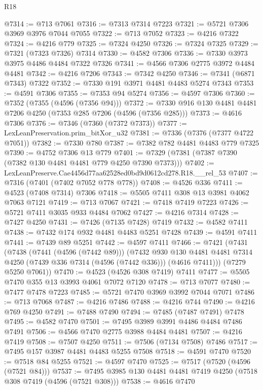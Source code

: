 \begin{lexlean}{R18}
\begin{coremodule}
@7314 := @713 @7061
@7316 := @7313 @7314 @7223
@7321 := @5721 @7306 @3969 @3976 @7044 @7055
@7322 := @713 @7052
@7323 := @4216 @7322
@7324 := @4216 @779
@7325 := @7324 @4250
@7326 := @7324 @7325
@7329 := @7321 (@7323 @7326) @7314
@7330 := @4582 @7306
@7336 := @7330 @3973 @3975 @4486 @4484 @7322 @7326
@7341 := @4566 @7306 @2775 @3972 @4484 @4481
@7342 := @4216 @7206
@7343 := @7342 @4250
@7346 := @7341 (@6871 @7343) @7322
@7352 := @7330 @191 @3971 @4481 @4483 @5274 @7343
@7353 := @4591 @7306
@7355 := @7353 @94 @5274
@7356 := @4597 @7306
@7360 := @7352 (@7355 (@4596 (@7356 @94)))
@7372 := @7330 @916 @130 @4481 @4481 @7206 @4250 (@7353 @285 @7206 (@4596 (@7356 @285)))
@7373 := @4616 @7306
@7376 := @7346 (@7360 (@7372 @7373))
@7377 := LexLeanPreservation.prim_bitXor_u32
@7381 := @7336 (@7376 (@7377 @4722 @7051))
@7382 := @7330 @780
@7387 := @7382 @782 @4481 @4483 @779 @7325
@7390 := @4752 @7306 @13 @779
@7401 := @7329 (@7381 (@7387 @7390 (@7382 @130 @4481 @4481 @779 @4250 @7390 @7373)))
@7402 := LexLeanPreserve.Cae4456d77aa62528ed0bd9d0612cd278.R18.__rel_53
@7407 := @7316 (@7401 (@7402 @7052 @778 @778))
@7408 := @4526 @336
@7411 := @4523 (@7408 @7314) @7306
@7418 := @5505 @7411 @308 @13 @3981 @4062 @7063 @7121
@7419 := @713 @7067
@7421 := @7418 @7419 @7223
@7426 := @5721 @7411 @3035 @933 @4484 @7062
@7427 := @4216 @7314
@7428 := @7427 @4250
@7431 := @7426 (@7135 @7428) @7419
@7432 := @4582 @7411
@7438 := @7432 @174 @932 @4481 @4483 @5251 @7428
@7439 := @4591 @7411
@7441 := @7439 @89 @5251
@7442 := @4597 @7411
@7466 := @7421
    (@7431
      (@7438
        (@7441 (@4596 (@7442 @89)))
        (@7432
          @930
          @130
          @4481
          @4481
          @7314
          @4250
          (@7439 @336 @7314 (@4596 (@7442 @336)))
          (@4616 @7411)))
      (@7279 @5250 @7061))
@7470 := @4523 (@4526 @308 @7419) @7411
@7477 := @5505 @7470 @355 @13 @3993 @4061 @7072 @7120
@7478 := @713 @7077
@7480 := @7477 @7478 @7223
@7485 := @5721 @7470 @3969 @3992 @7044 @7071
@7486 := @713 @7068
@7487 := @4216 @7486
@7488 := @4216 @744
@7490 := @4216 @769 @4250
@7491 := @7488 @7490
@7494 := @7485 (@7487 @7491) @7478
@7495 := @4582 @7470
@7501 := @7495 @3989 @3991 @4486 @4484 @7486 @7491
@7506 := @4566 @7470 @2775 @3988 @4484 @4481
@7507 := @4216 @7419
@7508 := @7507 @4250
@7511 := @7506 (@7134 @7508) @7486
@7517 := @7495 @157 @3987 @4481 @4483 @5255 @7508
@7518 := @4591 @7470
@7520 := @7518 @84 @5255
@7521 := @4597 @7470
@7525 := @7517 (@7520 (@4596 (@7521 @84)))
@7537 := @7495 @3985 @130 @4481 @4481 @7419 @4250 (@7518 @308 @7419 (@4596 (@7521 @308)))
@7538 := @4616 @7470

\end{coremodule}
\end{lexlean}
